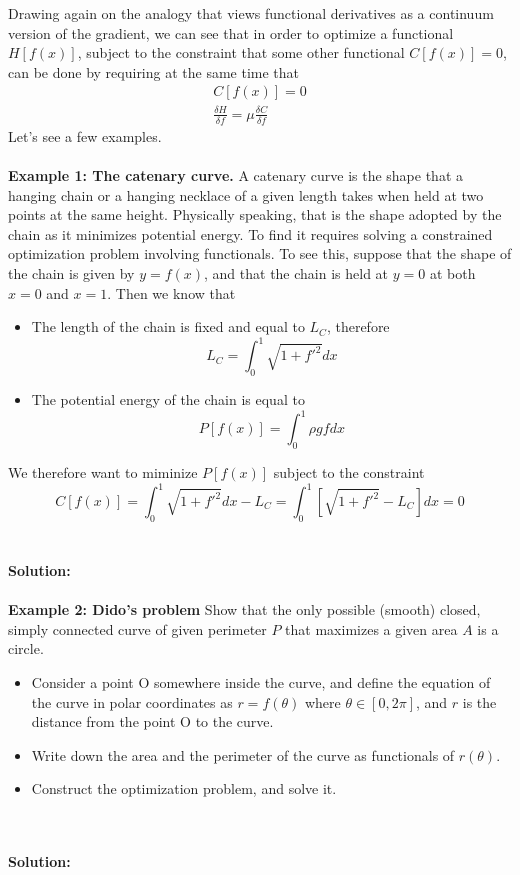 Drawing again on the analogy that views functional derivatives as a continuum version of the gradient, we can see that in order to optimize a functional $H[f(x)]$, subject to the constraint that some other functional $C[f(x)] = 0$, can be done by requiring at the same time that
\begin{eqnarray}
    C[f(x)] = 0 \\
    \frac{\delta H}{\delta f} = \mu \frac{\delta C}{\delta f}
    \end{eqnarray}
Let's see a few examples. 
\\
\\
{\bf Example 1: The catenary curve.} A catenary curve is the shape that a hanging chain or a hanging necklace of a given length takes when held at two points at the same height. Physically speaking, that is the shape adopted by the chain as it minimizes potential energy. To find it requires solving a constrained optimization problem involving functionals. To see this, suppose that the shape of the chain is given by $y = f(x)$, and that the chain is held at $y = 0$ at both $x = 0$ and $x = 1$. Then we know that 
\begin{itemize}
\item The length of the chain is fixed and equal to $L_C$, therefore 
$$ 
L_C = \int_0^1 \sqrt{1+f'^2} dx 
$$
\item The potential energy of the chain is equal to 
$$
P[f(x)] = \int_0^1 \rho g f dx 
$$
\end{itemize}
We therefore want to miminize $P[f(x)]$ subject to the constraint 
\begin{equation}
    C[f(x)] = \int_0^1 \sqrt{1+f'^2} dx  - L_C =\int_0^1 \left[ \sqrt{1+f'^2} - L_C \right] dx   = 0
 \end{equation}
\\
\\
{\bf \color{red} Solution:}
\\
\\
{\bf Example 2: Dido's problem} Show that the only possible (smooth) closed, simply connected curve of given perimeter $P$ that maximizes a given area $A$ is a circle. 
\begin{itemize}
    \item Consider a point O somewhere inside the curve, and define the equation of the curve in polar coordinates as $r = f(\theta)$ where $\theta \in [0,2\pi]$, and $r$ is the distance from the point O to the curve.
    \item Write down the area and the perimeter of the curve as functionals of $r(\theta)$. \item Construct the optimization problem, and solve it. 
\end{itemize}
\\
\\
{\bf \color{red} Solution:}

